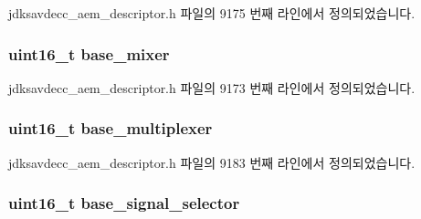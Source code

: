 jdksavdecc\+\_\+aem\+\_\+descriptor.\+h 파일의 9175 번째 라인에서 정의되었습니다.

\subsubsection[{\texorpdfstring{base\+\_\+mixer}{base_mixer}}]{\setlength{\rightskip}{0pt plus 5cm}uint16\+\_\+t base\+\_\+mixer}\hypertarget{structjdksavdecc__descriptor__video__unit_ad2cbeba461f7e25ffee9118ab1343ee0}{}\label{structjdksavdecc__descriptor__video__unit_ad2cbeba461f7e25ffee9118ab1343ee0}


jdksavdecc\+\_\+aem\+\_\+descriptor.\+h 파일의 9173 번째 라인에서 정의되었습니다.

\subsubsection[{\texorpdfstring{base\+\_\+multiplexer}{base_multiplexer}}]{\setlength{\rightskip}{0pt plus 5cm}uint16\+\_\+t base\+\_\+multiplexer}\hypertarget{structjdksavdecc__descriptor__video__unit_a3e13f295f26afe3335587c18790c7dda}{}\label{structjdksavdecc__descriptor__video__unit_a3e13f295f26afe3335587c18790c7dda}


jdksavdecc\+\_\+aem\+\_\+descriptor.\+h 파일의 9183 번째 라인에서 정의되었습니다.

\subsubsection[{\texorpdfstring{base\+\_\+signal\+\_\+selector}{base_signal_selector}}]{\setlength{\rightskip}{0pt plus 5cm}uint16\+\_\+t base\+\_\+signal\+\_\+selector}\hypertarget{structjdksavdecc__descriptor__video__unit_a5bd998af8a76ae1336006ec16829b64d}{}\label{structjdksavdecc__descriptor__video__unit_a5bd998af8a76ae1336006ec16829b64d}


